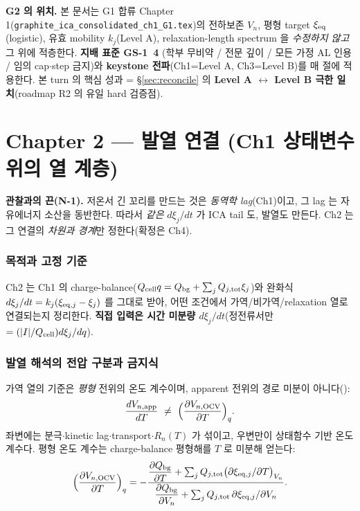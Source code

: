 
\begin{mdframed}
\textbf{G2 의 위치.} 본 문서는 G1 합류 Chapter 1(\texttt{graphite\_ica\_consolidated\_ch1\_G1.tex})의
전하보존 $V_n$, 평형 target $\xi_{\mathrm{eq}}$(logistic), 유효 mobility $k_j$(Level A), relaxation-length
spectrum 을 \emph{수정하지 않고} 그 위에 적층한다. \textbf{지배 표준 GS-1~4} (학부 무비약 / 전문
깊이 / 모든 가정 AL 인용 / 임의 cap$\cdot$step 금지)와 \textbf{keystone 전파}(Ch1=Level A,
Ch3=Level B)를 매 절에 적용한다. 본 turn 의 핵심 성과 = \S\ref{sec:reconcile} 의 \textbf{Level A
$\leftrightarrow$ Level B 극한 일치}(roadmap R2 의 유일 hard 검증점).
\end{mdframed}
\newpage

\part*{Chapter 2 — 발열 연결 (Ch1 상태변수 위의 열 계층)}
\setcounter{section}{0}

\begin{anchorbox}
\textbf{관찰과의 끈(N-1).} 저온서 긴 꼬리를 만드는 것은 \emph{동역학 lag}(Ch1)이고, 그 lag 는
자유에너지 소산을 동반한다. 따라서 \emph{같은} $d\xi_j/dt$ 가 ICA tail 도, 발열도 만든다. Ch2 는
그 연결의 \emph{차원과 경계}만 정한다(확정은 Ch4).
\end{anchorbox}

\section{목적과 고정 기준}\label{sec:ch2_scope}
Ch2 는 Ch1 의 charge-balance($Q_{\mathrm{cell}} q=Q_{\mathrm{bg}}+\sum_j Q_{j,\mathrm{tot}}\xi_j$)와 완화식
$d\xi_j/dt=k_j(\xi_{\mathrm{eq},j}-\xi_j)$ 를 그대로 받아, 어떤 조건에서 가역/비가역/relaxation 열로
연결되는지 정리한다. \textbf{직접 입력은 시간 미분량 $d\xi_j/dt$}(정전류서만 $=(|I|/Q_{\mathrm{cell}})d\xi_j/dq$).

\section{발열 해석의 전압 구분과 금지식}\label{sec:ch2_volt}
가역 열의 기준은 \emph{평형} 전위의 온도 계수이며, apparent 전위의 경로 미분이 아니다():
\begin{equation}
\frac{dV_{n,\mathrm{app}}}{dT}\ \ne\ \Big(\frac{\partial V_{n,\mathrm{OCV}}}{\partial T}\Big)_q .
\label{eq:ch2_forbid}
\end{equation}
좌변에는 분극$\cdot$kinetic lag$\cdot$transport$\cdot$$R_n(T)$ 가 섞이고, 우변만이 상태함수 기반
온도 계수다. 평형 온도 계수는 charge-balance 평형해를 $T$ 로 미분해 얻는다:
\begin{equation}
\Big(\frac{\partial V_{n,\mathrm{OCV}}}{\partial T}\Big)_q=
-\frac{\dfrac{\partial Q_{\mathrm{bg}}}{\partial T}+\sum_j Q_{j,\mathrm{tot}}\big(\partial \xi_{\mathrm{eq},j}/\partial T\big)_{V_n}}
{\dfrac{\partial Q_{\mathrm{bg}}}{\partial V_n}+\sum_j Q_{j,\mathrm{tot}}\,\partial \xi_{\mathrm{eq},j}/\partial V_n} .
\label{eq:ch2_dvdt}
\end{equation}

